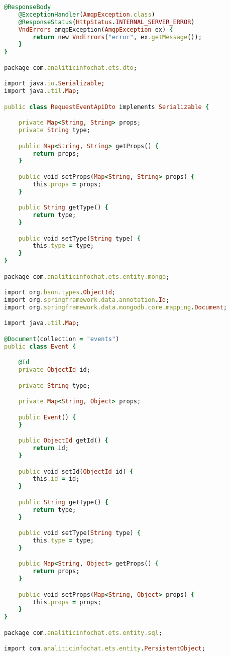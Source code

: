 \begin{lstlisting}[language=Ruby, style=rubystyle]
    @ResponseBody
    @ExceptionHandler(AmqpException.class)
    @ResponseStatus(HttpStatus.INTERNAL_SERVER_ERROR)
    VndErrors amqpException(AmqpException ex) {
        return new VndErrors("error", ex.getMessage());
    }
}

package com.analiticinfochat.ets.dto;

import java.io.Serializable;
import java.util.Map;

public class RequestEventApiDto implements Serializable {

    private Map<String, String> props;
    private String type;

    public Map<String, String> getProps() {
        return props;
    }

    public void setProps(Map<String, String> props) {
        this.props = props;
    }

    public String getType() {
        return type;
    }

    public void setType(String type) {
        this.type = type;
    }
}

package com.analiticinfochat.ets.entity.mongo;

import org.bson.types.ObjectId;
import org.springframework.data.annotation.Id;
import org.springframework.data.mongodb.core.mapping.Document;

import java.util.Map;

@Document(collection = "events")
public class Event {

    @Id
    private ObjectId id;

    private String type;

    private Map<String, Object> props;

    public Event() {
    }

    public ObjectId getId() {
        return id;
    }

    public void setId(ObjectId id) {
        this.id = id;
    }

    public String getType() {
        return type;
    }

    public void setType(String type) {
        this.type = type;
    }

    public Map<String, Object> getProps() {
        return props;
    }

    public void setProps(Map<String, Object> props) {
        this.props = props;
    }
}

package com.analiticinfochat.ets.entity.sql;

import com.analiticinfochat.ets.entity.PersistentObject;


\end{lstlisting}
